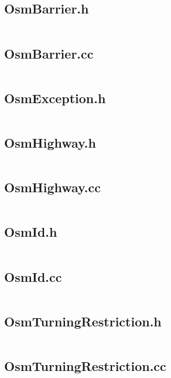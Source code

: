 \documentclass[../main.tex]{subfiles}
\begin{document}
\subsection{OsmBarrier.h}\label{lst:osm-barrier-h}
\inputminted[linenos=true]{cpp}{parts/code/osm/OsmBarrier.h}

\subsection{OsmBarrier.cc}\label{lst:osm-barrier-cc}
\inputminted[linenos=true]{cpp}{parts/code/osm/OsmBarrier.cc}

\subsection{OsmException.h}\label{lst:osm-exception-h}
\inputminted[linenos=true]{cpp}{parts/code/osm/OsmException.h}

\subsection{OsmHighway.h}\label{lst:osm-highway-h}
\inputminted[linenos=true]{cpp}{parts/code/osm/OsmHighway.h}

\subsection{OsmHighway.cc}\label{lst:osm-highway-cc}
\inputminted[linenos=true]{cpp}{parts/code/osm/OsmHighway.cc}

\subsection{OsmId.h}\label{lst:osm-id-h}
\inputminted[linenos=true]{cpp}{parts/code/osm/OsmId.h}

\subsection{OsmId.cc}\label{lst:osm-id-cc}
\inputminted[linenos=true]{cpp}{parts/code/osm/OsmId.cc}

\subsection{OsmTurningRestriction.h}\label{lst:osm-turning-restriction-h}
\inputminted[linenos=true]{cpp}{parts/code/osm/OsmTurningRestriction.h}

\subsection{OsmTurningRestriction.cc}\label{lst:osm-turning-restriction-cc}
\inputminted[linenos=true]{cpp}{parts/code/osm/OsmTurningRestriction.cc}
\end{document}
